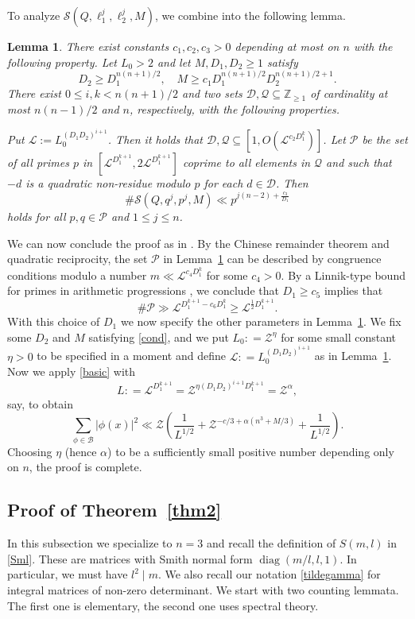 \documentclass[11pt,oneside]{amsart}
\numberwithin{equation}{section}
\theoremstyle{remark}
\theoremstyle{plain}
\newtheorem{lemma}{Lemma}
\DeclareMathOperator{\diag}{diag}
\newcommand\ZZ{\mathbb{Z}}
\newcommand{\mcB}{\mathcal{B}}
\newcommand{\mcD}{\mathcal{D}}
\newcommand{\mcL}{\mathcal{L}}
\newcommand{\mcQ}{\mathcal{Q}}
\newcommand{\mcP}{\mathcal{P}}
\newcommand{\mcS}{\mathcal{S}}
\newcommand{\mcZ}{\mathcal{Z}}
\renewcommand\leq{\leqslant}
\renewcommand\geq{\geqslant}
\begin{document}
To analyze $\mcS(Q, \ell_1^j, \ell_2^j, M)$, we combine \cite[Lem.~8 and~Prop.~1]{BM} into the following lemma. 
\begin{lemma}\label{BM-lemma} There exist constants $c_1, c_2, c_3 > 0$ depending at most on $n$ with the following property. Let $L_0 > 2$ and let $M, D_1, D_2 \geq 1$ satisfy 
\begin{equation}\label{cond}
D_2 \geq D_1^{n(n+1)/2}, \quad M \geq c_1D_1^{n(n+1)/2} D_2^{n(n+1)/2 + 1}.
\end{equation}
There exist $0 \leq i, k < n(n+1)/2$ and two sets $\mcD, \mcQ \subseteq \ZZ_{\geq 1}$ of cardinality at most $n(n-1)/2$ and $n$, respectively, with the following properties.

Put $\mcL := L_0^{(D_1D_2)^{i+1}}$. Then it holds that $\mcD, \mcQ \subseteq [1, O(\mcL^{c_2 D_1^k})]$. Let $\mcP$ be the set of all primes $p$ in $[\mcL^{D_1^{k+1}}, 2 \mcL^{D_1^{k+1}}]$ coprime to all elements in $\mcQ$ and such that $-d$ is a quadratic non-residue modulo $p$ for each $d \in \mcD$. Then 
\[
\#\mcS(Q, q^j, p^j, M) \ll p^{j(n-2) + \frac{c_3}{D_1}}
\]
holds for all $p, q \in \mcP$ and $1 \leq j \leq n$. 
\end{lemma}
We can now conclude the proof as in \cite[\S7]{BM}. By the Chinese remainder theorem and quadratic reciprocity, the set $\mcP$ in Lemma~\ref{BM-lemma} can be described by congruence conditions modulo a number $m \ll \mcL^{c_4D_1^k}$ for some $c_4>0$. By a Linnik-type bound for primes in arithmetic progressions \cite[Lem.~9]{BM}, we conclude that $D_1 \geq c_{5}$ implies that
$$\#\mcP \gg \mcL^{D_1^{k+1} - c_{6} D_1^k} \geq \mcL^{\frac{1}{2}D_1^{k+1}}.$$
With this choice of $D_1$ we now specify the other parameters in Lemma~\ref{BM-lemma}. We 
fix some $D_2$ and $M$ satisfying \eqref{cond}, and we put $L_0: = \mcZ^{\eta}$ 
for some small constant $\eta > 0$ to be specified in a moment and define $\mcL: = L_0^{(D_1D_2)^{i+1}}$ as in Lemma~\ref{BM-lemma}. Now we apply \eqref{basic} with
\[
L: = \mcL^{D_1^{k+1}} = \mcZ^{\eta (D_1D_2)^{i+1}D_1^{k+1} } = \mcZ^{\alpha},
\]
say, to obtain
$$\sum_{\phi\in\mcB}|\phi(x)|^2 \ll \mcZ \left(\frac{1}{L^{1/2}} + \mcZ^{-c/3 + \alpha (n^3+M/3)} + \frac{1}{L^{1/2}}\right).$$
Choosing $\eta$ (hence $\alpha$) to be a sufficiently small positive number depending only on $n$, the proof is complete.

\subsection{Proof of Theorem~\ref{thm2}}
In this subsection we specialize to $n=3$ and recall the definition of $S(m, l)$ in \eqref{Sml}. These are matrices with Smith normal form $\diag(m/l, l, 1)$. In particular, we must have $l^2 \mid m$. We also recall our notation \eqref{tildegamma} for integral matrices of non-zero determinant. We start with two counting lemmata. The first one is elementary, the second one uses spectral theory. 
\end{document}
